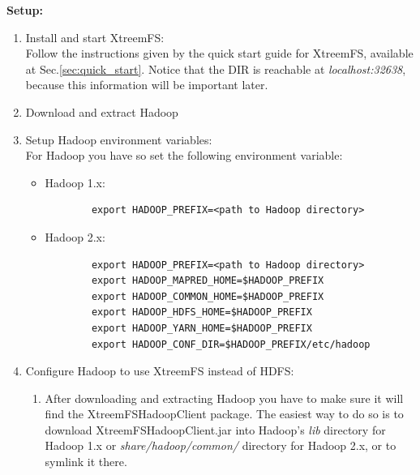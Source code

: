 \documentclass[a4paper,10pt]{book}
\begin{document}
\textbf{Setup:}
\begin{enumerate}
\item Install and start XtreemFS:\\
	Follow the instructions given by the quick start guide for XtreemFS, available at Sec.\ref{sec:quick_start}. Notice 	
	that the DIR is reachable at \textit{localhost:32638}, because this information will be important later.

\item Download and extract Hadoop

\item Setup Hadoop environment variables:\\
For Hadoop you have so set the following environment variable:
   \begin{itemize}
   \item Hadoop 1.x:
      \begin{verbatim}
		export HADOOP_PREFIX=<path to Hadoop directory>
      \end{verbatim}
      
   \item Hadoop 2.x:
      \begin{verbatim}
		export HADOOP_PREFIX=<path to Hadoop directory>
		export HADOOP_MAPRED_HOME=$HADOOP_PREFIX
		export HADOOP_COMMON_HOME=$HADOOP_PREFIX
		export HADOOP_HDFS_HOME=$HADOOP_PREFIX
		export HADOOP_YARN_HOME=$HADOOP_PREFIX
		export HADOOP_CONF_DIR=$HADOOP_PREFIX/etc/hadoop
      \end{verbatim}
   \end{itemize}

\item Configure Hadoop to use XtreemFS instead of HDFS:
	\begin{enumerate}
	\item After downloading and extracting Hadoop you have to make sure it will find the XtreemFSHadoopClient package. 
	The easiest way to do so is to download XtreemFSHadoopClient.jar into Hadoop's \textit{lib} directory for Hadoop 1.x or \textit{share/hadoop/common/} directory for Hadoop 2.x, or to symlink it there.


\end{enumerate}
\end{enumerate}
\end{document}
